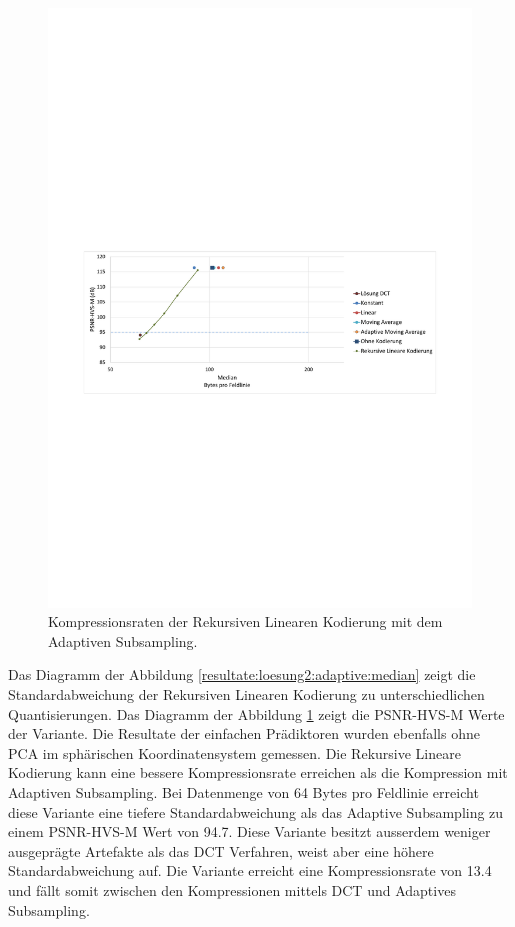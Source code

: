\begin{figure}[!htbp]
	\includegraphics[trim = 1.8cm 11cm 1.8cm 12.6cm, clip=true,width=1\textwidth,keepaspectratio]{./pictures/resultate/loesung2/variante2/resultate_psnr.pdf}
	
	\caption{Kompressionsraten der Rekursiven Linearen Kodierung mit dem Adaptiven Subsampling.}
	\label{resultate:loesung2:adaptive:median_psnr}
\end{figure}
Das Diagramm der Abbildung \ref{resultate:loesung2:adaptive:median} zeigt die Standardabweichung der Rekursiven Linearen Kodierung zu unterschiedlichen Quantisierungen. Das Diagramm der Abbildung \ref{resultate:loesung2:adaptive:median_psnr} zeigt die PSNR-HVS-M Werte der Variante. Die Resultate der einfachen Prädiktoren wurden ebenfalls ohne PCA im sphärischen Koordinatensystem gemessen. Die Rekursive Lineare Kodierung kann eine bessere Kompressionsrate erreichen als die Kompression mit Adaptiven Subsampling. Bei Datenmenge von 64 Bytes pro Feldlinie erreicht diese Variante eine tiefere Standardabweichung als das Adaptive Subsampling zu einem PSNR-HVS-M Wert von 94.7. Diese Variante besitzt ausserdem weniger ausgeprägte Artefakte als das DCT Verfahren, weist aber eine höhere Standardabweichung auf. Die Variante erreicht eine Kompressionsrate von 13.4 und fällt somit zwischen den Kompressionen mittels DCT und Adaptives Subsampling.

